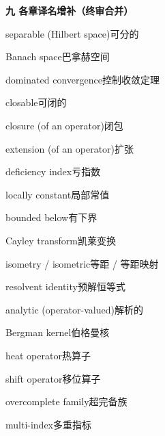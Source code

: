 \filbreak
\vspace{0.9em}
\noindent\textbf{九 各章译名增补（终审合并）}\par\nobreak\vspace{0.35em}
\begin{multicols}{2}
\raggedright
\setlength{\parindent}{0pt}
\setlength{\parskip}{0.16em}
\linespread{1.02}\selectfont
separable (Hilbert space)\hspace{0.9em}可分的\par
Banach space\hspace{0.9em}巴拿赫空间\par
dominated convergence\hspace{0.9em}控制收敛定理\par
closable\hspace{0.9em}可闭的\par
closure (of an operator)\hspace{0.9em}闭包\par
extension (of an operator)\hspace{0.9em}扩张\par
deficiency index\hspace{0.9em}亏指数\par
locally constant\hspace{0.9em}局部常值\par
bounded below\hspace{0.9em}有下界\par
Cayley transform\hspace{0.9em}凯莱变换\par
isometry / isometric\hspace{0.9em}等距 / 等距映射\par
resolvent identity\hspace{0.9em}预解恒等式\par
analytic (operator-valued)\hspace{0.9em}解析的\par
Bergman kernel\hspace{0.9em}伯格曼核\par
heat operator\hspace{0.9em}热算子\par
shift operator\hspace{0.9em}移位算子\par
overcomplete family\hspace{0.9em}超完备族\par
multi-index\hspace{0.9em}多重指标\par

\end{multicols}
